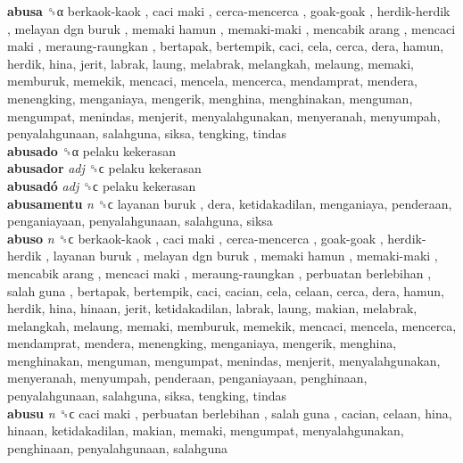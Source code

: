 \textbf{abusa} ␝α   berkaok-kaok ,  caci maki ,  cerca-mencerca ,  goak-goak ,  herdik-herdik ,  melayan dgn buruk ,  memaki hamun ,  memaki-maki ,  mencabik arang ,  mencaci maki ,  meraung-raungkan , bertapak, bertempik, caci, cela, cerca, dera, hamun, herdik, hina, jerit, labrak, laung, melabrak, melangkah, melaung, memaki, memburuk, memekik, mencaci, mencela, mencerca, mendamprat, mendera, menengking, menganiaya, mengerik, menghina, menghinakan, menguman, mengumpat, menindas, menjerit, menyalahgunakan, menyeranah, menyumpah, penyalahgunaan, salahguna, siksa, tengking, tindas  \\
\textbf{abusado} ␝α   pelaku kekerasan   \\
\textbf{abusador} \emph{adj}  ␝ϲ   pelaku kekerasan   \\
\textbf{abusadó} \emph{adj}  ␝ϲ   pelaku kekerasan   \\
\textbf{abusamentu} \emph{n}  ␝ϲ   layanan buruk , dera, ketidakadilan, menganiaya, penderaan, penganiayaan, penyalahgunaan, salahguna, siksa  \\
\textbf{abuso} \emph{n}  ␝ϲ   berkaok-kaok ,  caci maki ,  cerca-mencerca ,  goak-goak ,  herdik-herdik ,  layanan buruk ,  melayan dgn buruk ,  memaki hamun ,  memaki-maki ,  mencabik arang ,  mencaci maki ,  meraung-raungkan ,  perbuatan berlebihan ,  salah guna , bertapak, bertempik, caci, cacian, cela, celaan, cerca, dera, hamun, herdik, hina, hinaan, jerit, ketidakadilan, labrak, laung, makian, melabrak, melangkah, melaung, memaki, memburuk, memekik, mencaci, mencela, mencerca, mendamprat, mendera, menengking, menganiaya, mengerik, menghina, menghinakan, menguman, mengumpat, menindas, menjerit, menyalahgunakan, menyeranah, menyumpah, penderaan, penganiayaan, penghinaan, penyalahgunaan, salahguna, siksa, tengking, tindas  \\
\textbf{abusu} \emph{n}  ␝ϲ   caci maki ,  perbuatan berlebihan ,  salah guna , cacian, celaan, hina, hinaan, ketidakadilan, makian, memaki, mengumpat, menyalahgunakan, penghinaan, penyalahgunaan, salahguna  \\
